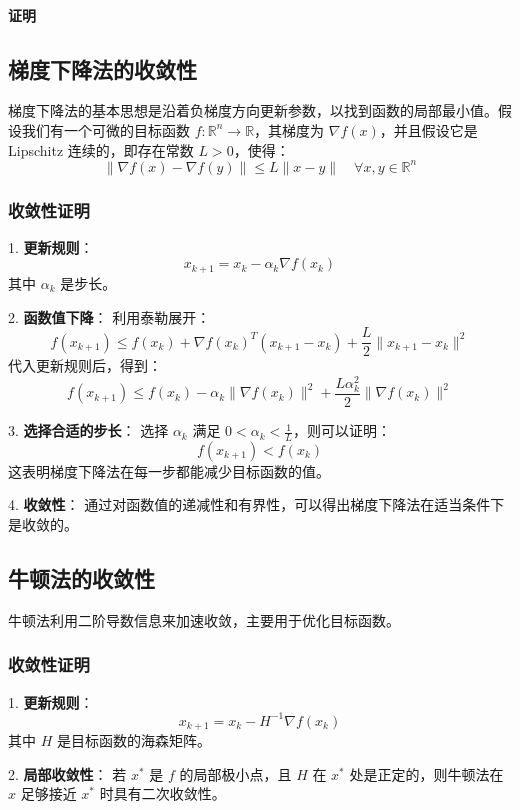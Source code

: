 \documentclass[a4paper]{article}
\begin{document}
\paragraph{证明}

\subsection{梯度下降法的收敛性}

梯度下降法的基本思想是沿着负梯度方向更新参数，以找到函数的局部最小值。假设我们有一个可微的目标函数 $f: \mathbb{R}^n \to \mathbb{R}$，其梯度为 $\nabla f(x)$，并且假设它是 Lipschitz 连续的，即存在常数 $L > 0$，使得：
\[
\|\nabla f(x) - \nabla f(y)\| \leq L \|x - y\| \quad \forall x, y \in \mathbb{R}^n
\]

\subsubsection{收敛性证明}

1. \textbf{更新规则}：
   \[
   x_{k+1} = x_k - \alpha_k \nabla f(x_k)
   \]
   其中 $\alpha_k$ 是步长。

2. \textbf{函数值下降}：
   利用泰勒展开：
   \[
   f(x_{k+1}) \leq f(x_k) + \nabla f(x_k)^T (x_{k+1} - x_k) + \frac{L}{2} \|x_{k+1} - x_k\|^2
   \]
   代入更新规则后，得到：
   \[
   f(x_{k+1}) \leq f(x_k) - \alpha_k \|\nabla f(x_k)\|^2 + \frac{L \alpha_k^2}{2} \|\nabla f(x_k)\|^2
   \]

3. \textbf{选择合适的步长}：
   选择 $\alpha_k$ 满足 $0 < \alpha_k < \frac{1}{L}$，则可以证明：
   \[
   f(x_{k+1}) < f(x_k)
   \]
   这表明梯度下降法在每一步都能减少目标函数的值。

4. \textbf{收敛性}：
   通过对函数值的递减性和有界性，可以得出梯度下降法在适当条件下是收敛的。

\subsection{牛顿法的收敛性}

牛顿法利用二阶导数信息来加速收敛，主要用于优化目标函数。

\subsubsection{收敛性证明}

1. \textbf{更新规则}：
   \[
   x_{k+1} = x_k - H^{-1} \nabla f(x_k)
   \]
   其中 $H$ 是目标函数的海森矩阵。

2. \textbf{局部收敛性}：
   若 $x^*$ 是 $f$ 的局部极小点，且 $H$ 在 $x^*$ 处是正定的，则牛顿法在 $x$ 足够接近 $x^*$ 时具有二次收敛性。
\end{document}
